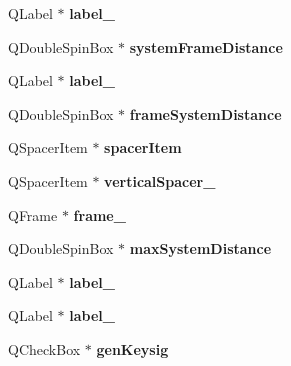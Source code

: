 \begin{DoxyCompactItemize}
Q\+Label $\ast$ {\bfseries label\+\_}
\item 
\mbox{\label{class_ui___edit_style_base_a24e5455325a793d8f1fa4aa21cc8a9d1}} 
Q\+Double\+Spin\+Box $\ast$ {\bfseries system\+Frame\+Distance}
\item 
\mbox{\label{class_ui___edit_style_base_aa3b8e85d6844e91f032253bda942364b}} 
Q\+Label $\ast$ {\bfseries label\+\_}
\item 
\mbox{\label{class_ui___edit_style_base_aaf8ede986856ad64d1e03b62219974d8}} 
Q\+Double\+Spin\+Box $\ast$ {\bfseries frame\+System\+Distance}
\item 
\mbox{\label{class_ui___edit_style_base_aa79f0a4ed85e8a6e96a54c797d794ada}} 
Q\+Spacer\+Item $\ast$ {\bfseries spacer\+Item}
\item 
\mbox{\label{class_ui___edit_style_base_a4b9c00179f740a08e66cce52745772f4}} 
Q\+Spacer\+Item $\ast$ {\bfseries vertical\+Spacer\+\_}
\item 
\mbox{\label{class_ui___edit_style_base_a1502023b5703114541c40f75d02f6b7e}} 
Q\+Frame $\ast$ {\bfseries frame\+\_}
\item 
\mbox{\label{class_ui___edit_style_base_a6c59439d805339af536eda1b3dc0fb05}} 
Q\+Double\+Spin\+Box $\ast$ {\bfseries max\+System\+Distance}
\item 
\mbox{\label{class_ui___edit_style_base_ad841585dcd813ebb2d0d2e71ffda6577}} 
Q\+Label $\ast$ {\bfseries label\+\_}
\item 
\mbox{\label{class_ui___edit_style_base_a662eabee863f35d94a84dba9240871a5}} 
Q\+Label $\ast$ {\bfseries label\+\_}
\item 
\mbox{\label{class_ui___edit_style_base_a9db71037aa41b6d174ca4eb83f05e2c6}} 
Q\+Check\+Box $\ast$ {\bfseries gen\+Keysig}
\item 
\mbox{\label{class_ui___edit_style_base_a54343fc788e45b7be13ec4ac99a6bbe0}} 

\end{DoxyCompactItemize}
